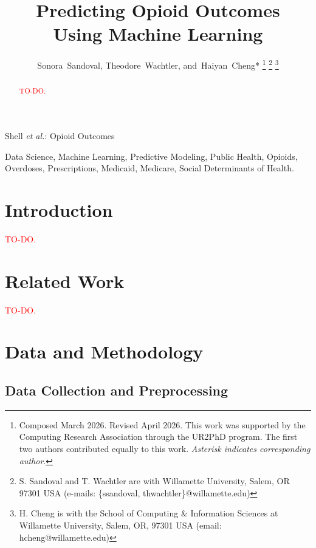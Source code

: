 \documentclass[journal]{IEEEtran}
\newcommand{\todo}{\textcolor{red}{TO-DO.} }
\begin{document}
    \title{Predicting Opioid Outcomes\\ Using Machine Learning}
    \author{Sonora~Sandoval, Theodore~Wachtler, and~Haiyan~Cheng*%
    \thanks{Composed March 2026. Revised April 2026.
    This work was supported by the Computing Research Association through the UR2PhD program.
    The first two authors contributed equally to this work.
    \textit{Asterisk indicates corresponding author}.}%
    \thanks{S. Sandoval and T. Wachtler are with Willamette University, Salem, OR 97301 USA (e-mails: \{ssandoval, thwachtler\}@willamette.edu)}%
    \thanks{H. Cheng is with the School of Computing \& Information Sciences at Willamette University, Salem, OR, 97301 USA (email: hcheng@willamette.edu)}}

    {Shell \MakeLowercase{\textit{et al.}}: Opioid Outcomes}

    \maketitle

    \begin{abstract}
        \todo
    \end{abstract}
    \begin{IEEEkeywords}
        Data Science, Machine Learning, Predictive Modeling, Public Health, Opioids, Overdoses, Prescriptions, Medicaid, Medicare, Social Determinants of Health.
    \end{IEEEkeywords}

    \IEEEpeerreviewmaketitle


    \section{Introduction}

    \todo \cite{lastTitleDate}


    \section{Related Work}

    \todo


    \section{Data and Methodology}

    \subsection{Data Collection and Preprocessing}
\end{document}
